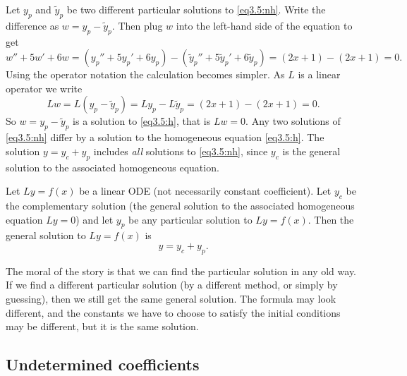 Let $y_p$ and $\tilde{y}_p$ be two different
particular solutions 
to \eqref{eq3.5:nh}.
Write the difference as
$w = y_p - \tilde{y}_p$.  Then plug $w$
into the left-hand side of the equation to get
\begin{equation*}
w'' + 5w'+ 6w =
(y_p'' + 5y_p'+ 6y_p) -
(\tilde{y}_p'' + 5\tilde{y}_p'+ 6\tilde{y}_p) =
(2x+1) - (2x+1) = 0 .
\end{equation*}
Using the operator notation the calculation becomes simpler.
As $L$ is a linear operator we write
\begin{equation*}
Lw = L(y_p - \tilde{y}_p) =
Ly_p - L\tilde{y}_p =
(2x+1)-(2x+1) = 0 .
\end{equation*}
So $w = y_p - \tilde{y}_p$ is a solution to \eqref{eq3.5:h}, that is
$Lw = 0$.  Any two
solutions of \eqref{eq3.5:nh} differ by a solution to the homogeneous
equation \eqref{eq3.5:h}.  The solution $y = y_c + y_p$ includes \emph{all}
solutions to \eqref{eq3.5:nh},
since $y_c$ is the general solution to the associated homogeneous equation.

\begin{theorem}
Let $Ly=f(x)$ be a linear ODE (not necessarily constant
coefficient).  Let $y_c$ be the complementary solution
(the general
solution to the associated homogeneous equation $Ly = 0$) and let $y_p$
be any particular solution to $Ly=f(x)$.  Then the general
solution to $Ly=f(x)$ is
\begin{equation*}
y = y_c + y_p.
\end{equation*}
\end{theorem}

The moral of the story is that we can find the particular solution in any old
way.  If we find a different particular solution (by a different method,
or simply by guessing),
then we still get the same general solution.
The formula may 
look different, and the constants we have to choose to
satisfy
the initial conditions may be different, but it is the same solution.

\subsection{Undetermined coefficients}

